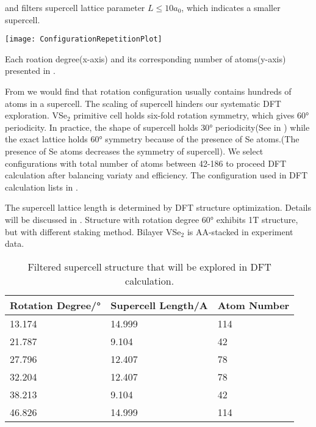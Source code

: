 	\begin{kaobox}[frametitle=Notes]
		 and  filters supercell lattice parameter $L \le 10 a_0$, which indicates a smaller supercell.
	\end{kaobox}

	\begin{marginfigure}[]
		\texttt{[image: ConfigurationRepetitionPlot]}
		\caption[Each roation degree and its corresponding number of atoms]{
			Each roation degree(x-axis) and its corresponding number of atoms(y-axis) presented in .
		}
	\end{marginfigure}

From  we would find that rotation configuration usually contains hundreds of atoms in a supercell. The scaling of supercell hinders our systematic DFT exploration. VSe$_2$ primitive cell holds six-fold rotation symmetry, which gives 60° periodicity. In practice, the shape of supercell holds 30° periodicity(See in ) while the exact lattice holds 60° symmetry because of the presence of Se atoms.(\ie The presence of Se atoms decreases the symmetry of supercell). We select configurations with total number of atoms between 42-186 to proceed DFT calculation after balancing variaty and efficiency. The configuration used in DFT calculation lists in .

The supercell lattice length is determined by DFT structure optimization. Details will be discussed in . Structure with rotation degree 60° exhibits 1T structure, but with different staking method. Bilayer VSe$_2$ is AA-stacked in experiment data.

\begin{table}[h]
	\caption[Filtered supercell structure that will be explored in DFT calculation]{
		Filtered supercell structure that will be explored in DFT calculation.
	}
	\begin{tabular}{lll}
	\toprule
	Rotation Degree/° & Supercell Length/A & Atom Number \\
	\midrule
	13.174            & 14.999             & 114         \\
	21.787            & 9.104              & 42          \\
	27.796            & 12.407             & 78          \\
	32.204            & 12.407             & 78          \\
	38.213            & 9.104              & 42          \\
	46.826            & 14.999             & 114         \\
	\bottomrule
	\end{tabular}
\end{table}


